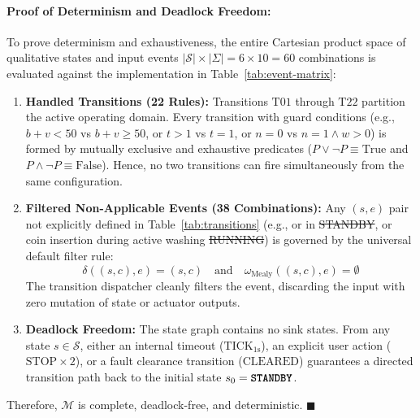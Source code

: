 \paragraph{Proof of Determinism and Deadlock Freedom:}
To prove determinism and exhaustiveness, the entire Cartesian product space of qualitative states
and input events $|\mathcal{S}| \times |\Sigma| = 6 \times 10 = 60$ combinations is evaluated
against the implementation in Table~\ref{tab:event-matrix}:
\begin{enumerate}
  \item \textbf{Handled Transitions (22 Rules):} Transitions $\text{T01}$ through $\text{T22}$ partition
        the active operating domain. Every transition with guard conditions (e.g., $b+v < 50$ vs $b+v \ge 50$,
        or $t > 1$ vs $t = 1$, or $n = 0$ vs $n = 1 \land w > 0$) is formed by mutually exclusive and
        exhaustive predicates ($P \lor \neg P \equiv \text{True}$ and $P \land \neg P \equiv \text{False}$).
        Hence, no two transitions can fire simultaneously from the same configuration.
  \item \textbf{Filtered Non-Applicable Events (38 Combinations):} Any $(s, e)$ pair not explicitly defined
        in Table~\ref{tab:transitions} (e.g.,  or  in \st{STANDBY}, or coin insertion
        during active washing \st{RUNNING}) is governed by the universal default filter rule:
        \begin{equation}
          \delta((s, c), e) = (s, c) \quad \text{and} \quad \omega_{\text{Mealy}}((s, c), e) = \emptyset
        \end{equation}
        The transition dispatcher cleanly filters the event, discarding the input
        with zero mutation of state or actuator outputs.
  \item \textbf{Deadlock Freedom:} The state graph contains no sink states. From any state $s \in \mathcal{S}$,
        either an internal timeout ($\text{TICK}_{1\text{s}}$), an explicit user action ($\text{STOP} \times 2$),
        or a fault clearance transition ($\text{CLEARED}$) guarantees a directed transition path back to
        the initial state $s_0 = \text{\texttt{\textbf{STANDBY}}}$.
\end{enumerate}
Therefore, $\mathcal{M}$ is complete, deadlock-free, and deterministic. \hfill $\blacksquare$

